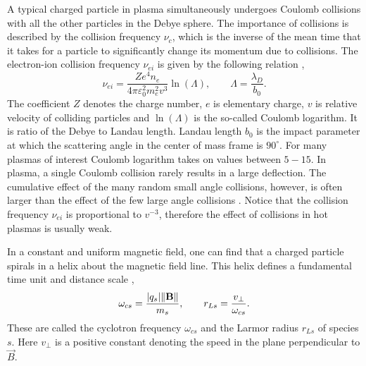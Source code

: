 A typical charged particle in plasma simultaneously undergoes Coulomb collisions with all the other particles in the Debye sphere. The importance of collisions is described by the collision frequency $ \nu_c $, which is the inverse of the mean time that it takes for a particle to significantly change its momentum due to collisions. The electron-ion collision frequency $ \nu_{ei} $ is given by the following relation \cite{nicholson},
\begin{equation}
\label{2.1.6}
\nu_{ei} = \frac{Z e^4 n_e}{4 \pi \varepsilon_0^2 m_e^2 v^3} \ln{\left(\Lambda\right)}, \qquad \Lambda = \frac{\lambda_D}{b_0}.
\end{equation}
The coefficient $ Z $ denotes the charge number, $ e $ is elementary charge, $ v $ is relative velocity of colliding particles and $ \ln{\left(\Lambda\right)} $ is the so-called Coulomb logarithm. It is ratio of the Debye to Landau length. Landau length $ b_0 $ is the impact parameter at which the scattering angle in the center of mass frame is $ 90^\circ $. For many plasmas of interest Coulomb logarithm takes on values between $ 5 - 15 $. In plasma, a single Coulomb collision rarely results in a large deflection. The cumulative effect of the many random small angle collisions, however, is often larger than the effect of the few large angle collisions \cite{Chen1984}. Notice that the collision frequency $ \nu_{ei} $ is proportional to $ v^{-3} $, therefore the effect of collisions in hot plasmas is usually weak.

In a constant and uniform magnetic field, one can find that a charged particle spirals in a helix about the magnetic field line. This helix defines a fundamental time unit and distance scale \cite{Chen1984},
\begin{equation}
\label{2.1.7}
\omega_{cs} = \frac{\lvert q_{s}\rvert \lVert\mathbf{B}\rVert}{m_{s}}, \qquad r_{Ls} = \frac{v_\perp}{\omega_{cs}}.
\end{equation}
These are called the cyclotron frequency $ \omega_{cs} $ and the Larmor radius $ r_{Ls} $ of species $ s $. Here $ v_\perp $ is a positive constant denoting the speed in the plane perpendicular to $ \vec{B} $.
